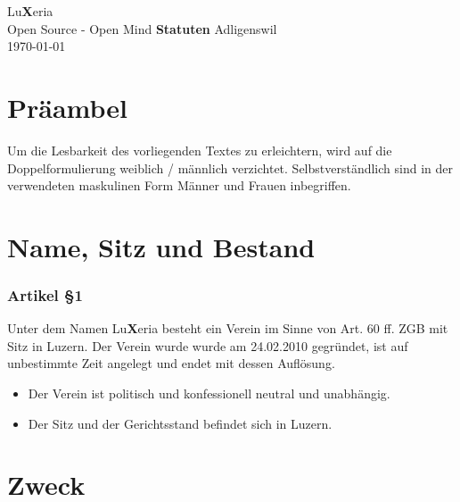 \documentclass[a4paper,10pt,fleqn]{article}
\begin{document}



\begin{titlepage}
\begin{center}
\vfill{\Large Lu\textbf{X}eria\\ \small Open Source - Open
Mind}
\vfill{\Huge \textbf{Statuten}}
\vfill{\Large Adligenswil\\ \today  }
\end{center}
\end{titlepage}


\tableofcontents
\newpage

\section*{Präambel}
Um die Lesbarkeit des vorliegenden Textes zu
erleichtern, wird auf die Doppelformulierung weiblich /
männlich verzichtet. Selbstverständlich sind in der
verwendeten maskulinen Form Männer und Frauen inbegriffen.

\section{Name, Sitz und Bestand}

\subsubsection*{Artikel §1}
Unter dem Namen Lu\textbf{X}eria besteht ein Verein im
Sinne von Art. 60 ff. ZGB mit Sitz in Luzern. Der
Verein wurde wurde am 24.02.2010 gegründet, ist auf
unbestimmte Zeit angelegt und endet mit dessen Auflösung.
\begin{itemize}
\item Der Verein ist politisch und konfessionell neutral 
und unabhängig.
\item Der Sitz und der Gerichtsstand befindet sich in
Luzern.
\end{itemize}

\section{Zweck}
\end{document}
